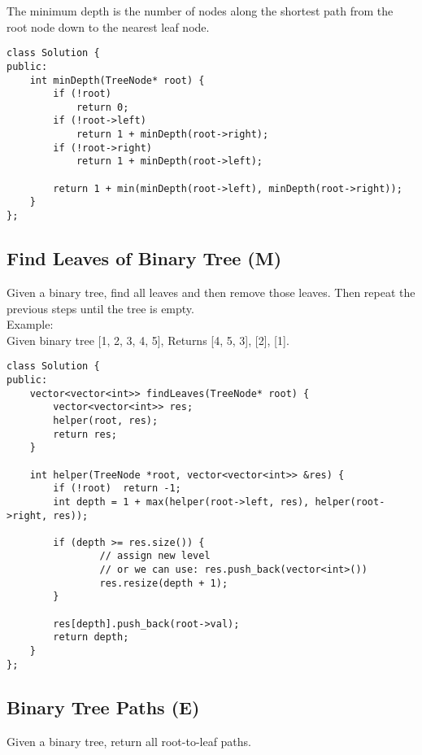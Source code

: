 The minimum depth is the number of nodes along the shortest path from the root node down to the nearest leaf node.\\

\begin{lstlisting}
class Solution {
public:
    int minDepth(TreeNode* root) {
        if (!root) 
            return 0;
        if (!root->left) 
            return 1 + minDepth(root->right);
        if (!root->right) 
            return 1 + minDepth(root->left);
            
        return 1 + min(minDepth(root->left), minDepth(root->right));
    }
};
\end{lstlisting}


\subsection{Find Leaves of Binary Tree (M)}
Given a binary tree, find all leaves and then remove those leaves. Then repeat the previous steps until the tree is empty.\\

Example:\\
Given binary tree [1, 2, 3, 4, 5], Returns [4, 5, 3], [2], [1].\\

\begin{lstlisting}
class Solution {
public:
    vector<vector<int>> findLeaves(TreeNode* root) {
        vector<vector<int>> res;
        helper(root, res);
        return res;
    }
    
    int helper(TreeNode *root, vector<vector<int>> &res) {
        if (!root)  return -1;
        int depth = 1 + max(helper(root->left, res), helper(root->right, res));
        
        if (depth >= res.size()) {
                // assign new level
                // or we can use: res.push_back(vector<int>())
        		res.resize(depth + 1);
        }
        
        res[depth].push_back(root->val);
        return depth;
    }
};
\end{lstlisting}


\subsection{Binary Tree Paths (E)}
Given a binary tree, return all root-to-leaf paths. \\


